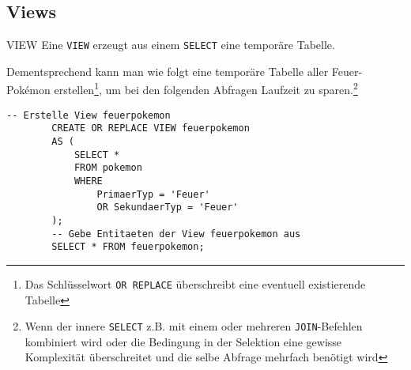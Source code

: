 \subsection{Views}

\begin{sql}{VIEW}
    Eine \texttt{VIEW} erzeugt aus einem \texttt{SELECT} eine temporäre Tabelle.

    Dementsprechend kann man wie folgt eine temporäre Tabelle aller Feuer-Pokémon erstellen\footnote{Das Schlüsselwort \texttt{OR REPLACE} überschreibt eine eventuell existierende Tabelle}, um bei den folgenden Abfragen Laufzeit zu sparen.\footnote{Wenn der innere \texttt{SELECT} z.B. mit einem oder mehreren \texttt{JOIN}-Befehlen kombiniert wird oder die Bedingung in der Selektion eine gewisse Komplexität überschreitet und die selbe Abfrage mehrfach benötigt wird}

    \begin{lstlisting}[language=mysql]
        -- Erstelle View feuerpokemon
        CREATE OR REPLACE VIEW feuerpokemon
        AS (
            SELECT *
            FROM pokemon
            WHERE
                PrimaerTyp = 'Feuer'
                OR SekundaerTyp = 'Feuer'
        );
        -- Gebe Entitaeten der View feuerpokemon aus
        SELECT * FROM feuerpokemon;
    \end{lstlisting}


\end{sql}
